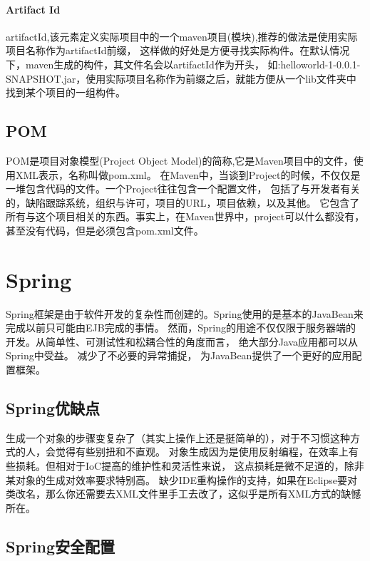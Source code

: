 \documentclass{book}
\begin{document}
\paragraph{Artifact Id}
artifactId,该元素定义实际项目中的一个maven项目(模块),推荐的做法是使用实际项目名称作为artifactId前缀，
这样做的好处是方便寻找实际构件。在默认情况下，maven生成的构件，其文件名会以artifactId作为开头，
如:helloworld-1-0.0.1-SNAPSHOT.jar，使用实际项目名称作为前缀之后，就能方便从一个lib文件夹中找到某个项目的一组构件。


\subsection{POM}

POM是项目对象模型(Project Object Model)的简称,它是Maven项目中的文件，使用XML表示，名称叫做pom.xml。
在Maven中，当谈到Project的时候，不仅仅是一堆包含代码的文件。一个Project往往包含一个配置文件，
包括了与开发者有关的，缺陷跟踪系统，组织与许可，项目的URL，项目依赖，以及其他。
它包含了所有与这个项目相关的东西。事实上，在Maven世界中，project可以什么都没有，甚至没有代码，但是必须包含pom.xml文件。

\section{Spring}

Spring框架是由于软件开发的复杂性而创建的。Spring使用的是基本的JavaBean来完成以前只可能由EJB完成的事情。
然而，Spring的用途不仅仅限于服务器端的开发。从简单性、可测试性和松耦合性的角度而言，
绝大部分Java应用都可以从Spring中受益。
减少了不必要的异常捕捉，
为JavaBean提供了一个更好的应用配置框架。

\subsection{Spring优缺点}

生成一个对象的步骤变复杂了（其实上操作上还是挺简单的），对于不习惯这种方式的人，会觉得有些别扭和不直观。
对象生成因为是使用反射编程，在效率上有些损耗。但相对于IoC提高的维护性和灵活性来说，
这点损耗是微不足道的，除非某对象的生成对效率要求特别高。
缺少IDE重构操作的支持，如果在Eclipse要对类改名，那么你还需要去XML文件里手工去改了，这似乎是所有XML方式的缺憾所在。

\subsection{Spring安全配置}
\end{document}
